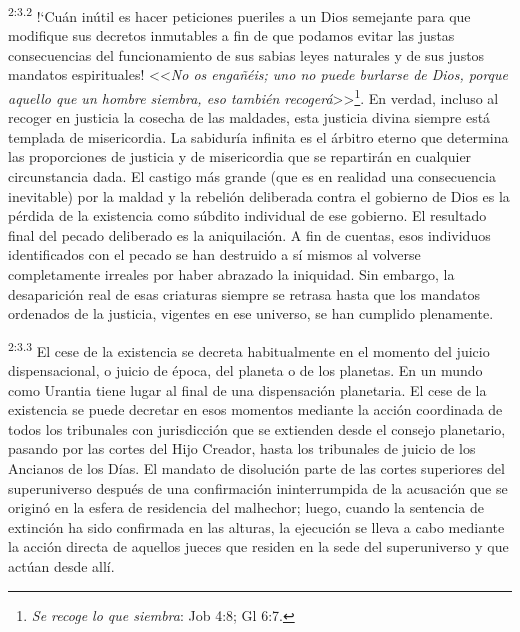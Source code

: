 \par
\textsuperscript{2:3.2} !`Cuán inútil es hacer peticiones pueriles a un Dios semejante para que modifique sus decretos inmutables a fin de que podamos evitar las justas consecuencias del funcionamiento de sus sabias leyes naturales y de sus justos mandatos espirituales! <<\textit{No os engañéis; uno no puede burlarse de Dios, porque aquello que un hombre siembra, eso también recogerá}>>\footnote{\textit{Se recoge lo que siembra}: Job 4:8; Gl 6:7.}. En verdad, incluso al recoger en justicia la cosecha de las maldades, esta justicia divina siempre está templada de misericordia. La sabiduría infinita es el árbitro eterno que determina las proporciones de justicia y de misericordia que se repartirán en cualquier circunstancia dada. El castigo más grande (que es en realidad una consecuencia inevitable) por la maldad y la rebelión deliberada contra el gobierno de Dios es la pérdida de la existencia como súbdito individual de ese gobierno. El resultado final del pecado deliberado es la aniquilación. A fin de cuentas, esos individuos identificados con el pecado se han destruido a sí mismos al volverse completamente irreales por haber abrazado la iniquidad. Sin embargo, la desaparición real de esas criaturas siempre se retrasa hasta que los mandatos ordenados de la justicia, vigentes en ese universo, se han cumplido plenamente.

\par
\textsuperscript{2:3.3} El cese de la existencia se decreta habitualmente en el momento del juicio dispensacional, o juicio de época, del planeta o de los planetas. En un mundo como Urantia tiene lugar al final de una dispensación planetaria. El cese de la existencia se puede decretar en esos momentos mediante la acción coordinada de todos los tribunales con jurisdicción que se extienden desde el consejo planetario, pasando por las cortes del Hijo Creador, hasta los tribunales de juicio de los Ancianos de los Días. El mandato de disolución parte de las cortes superiores del superuniverso después de una confirmación ininterrumpida de la acusación que se originó en la esfera de residencia del malhechor; luego, cuando la sentencia de extinción ha sido confirmada en las alturas, la ejecución se lleva a cabo mediante la acción directa de aquellos jueces que residen en la sede del superuniverso y que actúan desde allí.

